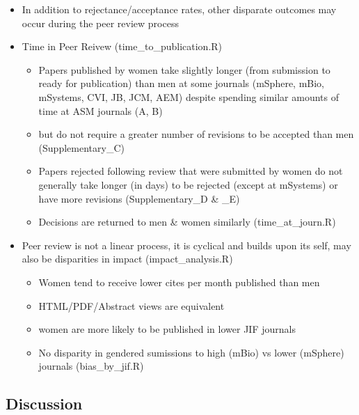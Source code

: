 \documentclass[11pt,]{article}
\providecommand{\tightlist}{%
  \setlength{\itemsep}{0pt}\setlength{\parskip}{0pt}}
\begin{document}
\begin{itemize}
\tightlist
\item
  In addition to rejectance/acceptance rates, other disparate outcomes
  may occur during the peer review process
\item
  Time in Peer Reivew (time\_to\_publication.R)

  \begin{itemize}
  \tightlist
  \item
    Papers published by women take slightly longer (from submission to
    ready for publication) than men at some journals (mSphere, mBio,
    mSystems, CVI, JB, JCM, AEM) despite spending similar amounts of
    time at ASM journals (A, B)
  \item
    but do not require a greater number of revisions to be accepted than
    men (Supplementary\_C)
  \item
    Papers rejected following review that were submitted by women do not
    generally take longer (in days) to be rejected (except at mSystems)
    or have more revisions (Supplementary\_D \& \_E)
  \item
    Decisions are returned to men \& women similarly (time\_at\_journ.R)
  \end{itemize}
\item
  Peer review is not a linear process, it is cyclical and builds upon
  its self, may also be disparities in impact (impact\_analysis.R)

  \begin{itemize}
  \tightlist
  \item
    Women tend to receive lower cites per month published than men
  \item
    HTML/PDF/Abstract views are equivalent
  \item
    women are more likely to be published in lower JIF journals
  \item
    No disparity in gendered sumissions to high (mBio) vs lower
    (mSphere) journals (bias\_by\_jif.R)
  \end{itemize}
\end{itemize}

\subsection{Discussion}\label{discussion}
\end{document}
